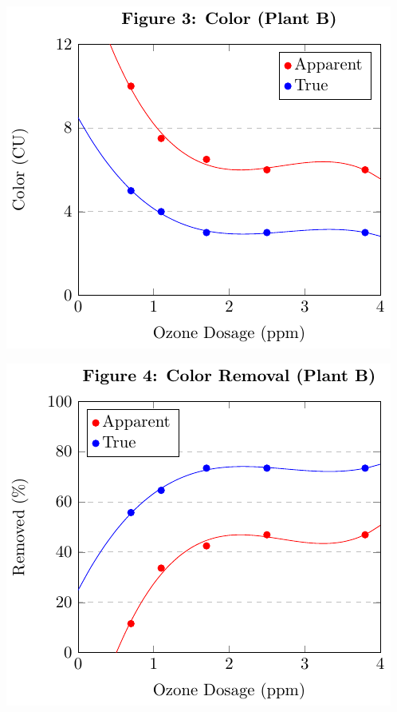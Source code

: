 \begin{center}
\begin{minipage}{.5\textwidth}
    \centering
    \includegraphics*[page=1]{figs/fig3.pdf}
    \end{minipage}%
    \begin{minipage}{.5\textwidth}
    \centering
    \includegraphics*[page=1]{figs/fig4.pdf}
    \end{minipage}
    \vspace{6mm}


\end{center}
